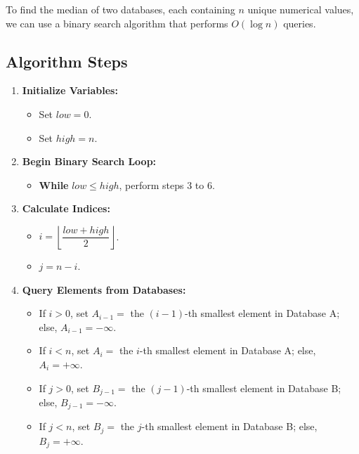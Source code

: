 \documentclass[10pt,letter,notitlepage]{article}
\begin{document}
\begin{Answer}

To find the median of two databases, each containing $n$ unique numerical values, we can use a binary search algorithm that performs $O(\log n)$ queries.

\subsection*{Algorithm Steps}

\begin{enumerate}
    \item \textbf{Initialize Variables:}
    \begin{itemize}
        \item Set $low = 0$.
        \item Set $high = n$.
    \end{itemize}
    
    \item \textbf{Begin Binary Search Loop:}
    \begin{itemize}
        \item \textbf{While} $low \leq high$, perform steps 3 to 6.
    \end{itemize}
    
    \item \textbf{Calculate Indices:}
    \begin{itemize}
        \item $i = \left\lfloor \dfrac{low + high}{2} \right\rfloor$.
        \item $j = n - i$.
    \end{itemize}
    
    \item \textbf{Query Elements from Databases:}
    \begin{itemize}
        \item If $i > 0$, set $A_{i-1} =$ the $(i-1)$-th smallest element in Database A; else, $A_{i-1} = -\infty$.
        \item If $i < n$, set $A_i =$ the $i$-th smallest element in Database A; else, $A_i = +\infty$.
        \item If $j > 0$, set $B_{j-1} =$ the $(j-1)$-th smallest element in Database B; else, $B_{j-1} = -\infty$.
        \item If $j < n$, set $B_j =$ the $j$-th smallest element in Database B; else, $B_j = +\infty$.
    \end{itemize}
    

\end{enumerate}
\end{Answer}
\end{document}
